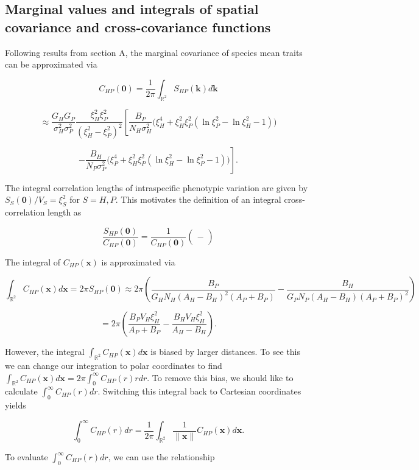 \documentclass{article}
\begin{document}
\hypertarget{marginal-values-and-integrals-of-spatial-covariance-and-cross-covariance-functions}{%
\subsection{Marginal values and integrals of spatial covariance and
cross-covariance
functions}\label{marginal-values-and-integrals-of-spatial-covariance-and-cross-covariance-functions}}

Following results from section A, the marginal covariance of species
mean traits can be approximated via

\[C_{HP}(\pmb 0)=\frac{1}{2\pi}\int_{\mathbb R^2}S_{HP}(\pmb k)d\pmb k\]

\[\approx \frac{G_HG_P}{\sigma_H^2\sigma_P^2}\frac{\xi_H^2\xi_P^2}{(\xi_H^2-\xi_P^2)^2}\left[\frac{B_P}{N_H\sigma_H^2}\Big(\xi_H^4+\xi_H^2\xi_P^2(\ln\xi_P^2-\ln\xi_H^2-1)\Big)\right.\]

\[\left.-\frac{B_H}{N_P\sigma_P^2}\Big(\xi_P^4+\xi_H^2\xi_P^2(\ln\xi_H^2-\ln\xi_P^2-1)\Big)\right].\]

The integral correlation lengths of intraspecific phenotypic variation
are given by \(S_S(\pmb 0)/V_S=\xi_S^2\) for \(S=H,P\). This motivates
the definition of an integral cross-correlation length as

\[\frac{S_{HP}(\pmb 0)}{C_{HP}(\pmb 0)}=\frac{1}{C_{HP}(\pmb 0)}\left(\frac{}{}-\frac{}{}\right)\]

The integral of \(C_{HP}(\pmb x)\) is approximated via

\[\int_{\mathbb R^2}C_{HP}(\pmb x)d\pmb x=2\pi S_{HP}(\pmb 0)\approx2\pi \left(\frac{B_P}{G_HN_H(A_H-B_H)^2(A_P+B_P)}-\frac{B_H}{G_PN_P(A_H-B_H)(A_P+B_P)^2}\right)\]

\[=2\pi\left(\frac{B_PV_H\xi_H^2}{A_P+B_P}-\frac{B_HV_H\xi_H^2}{A_H-B_H}\right).\]

However, the integral \(\int_{\mathbb R^2}C_{HP}(\pmb x)d\pmb x\) is
biased by larger distances. To see this we can change our integration to
polar coordinates to find
\(\int_{\mathbb R^2}C_{HP}(\pmb x)d\pmb x=2\pi\int_0^\infty C_{HP}(r)rdr\).
To remove this bias, we should like to calculate
\(\int_0^\infty C_{HP}(r)dr\). Switching this integral back to Cartesian
coordinates yields

\[\int_0^\infty C_{HP}(r)dr=\frac{1}{2\pi}\int_{\mathbb R^2}\frac{1}{\|\pmb x\|}C_{HP}(\pmb x)d\pmb x.\]

To evaluate \(\int_0^\infty C_{HP}(r)dr\), we can use the relationship
\end{document}
